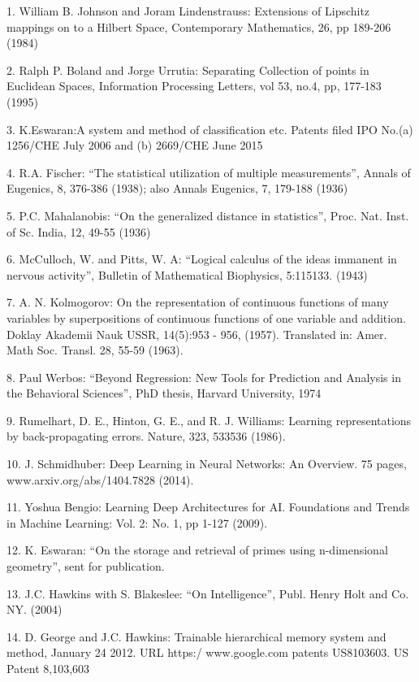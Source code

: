 \documentclass[english]{article}
\begin{document}
1. William B. Johnson and Joram Lindenstrauss: Extensions of Lipschitz
mappings on to a Hilbert Space, Contemporary Mathematics, 26, pp 189-206
(1984)

2. Ralph P. Boland and Jorge Urrutia: Separating Collection of points
in Euclidean Spaces, Information Processing Letters, vol 53, no.4,
pp, 177-183 (1995)

3. K.Eswaran:A system and method of classification etc. Patents filed
IPO No.(a) 1256/CHE July 2006 and (b) 2669/CHE June 2015

4. R.A. Fischer: {}``The statistical utilization of multiple
measurements'', Annals of Eugenics, 8, 376-386 (1938); also Annals
Eugenics, 7, 179-188 (1936)

5. P.C. Mahalanobis: {}``On the generalized distance in statistics'',
Proc. Nat. Inst. of Sc. India, 12, 49-55 (1936)

6. McCulloch, W. and Pitts, W. A: {}``Logical calculus of the
ideas immanent in nervous activity'', Bulletin of Mathematical Biophysics,
5:115\textendash{}133. (1943)

7. A. N. Kolmogorov: On the representation of continuous functions
of many variables by superpositions of continuous functions of one
variable and addition. Doklay Akademii Nauk USSR, 14(5):953 - 956,
(1957). Translated in: Amer. Math Soc. Transl. 28, 55-59 (1963).

8. Paul Werbos: {}``Beyond Regression: New Tools for Prediction
and Analysis in the Behavioral Sciences'', PhD thesis, Harvard University,
1974

9. Rumelhart, D. E., Hinton, G. E., and R. J. Williams: Learning
representations by back-propagating errors. Nature, 323, 533\textendash{}536
(1986).

10. J. Schmidhuber: Deep Learning in Neural Networks: An Overview.
75 pages, www.arxiv.org/abs/1404.7828 (2014).

11. Yoshua Bengio: Learning Deep Architectures for AI. Foundations
and Trends in Machine Learning: Vol. 2: No. 1, pp 1-127 (2009).

12. K. Eswaran: {}``On the storage and retrieval of primes using
n-dimensional geometry'', sent for publication.

13. J.C. Hawkins with S. Blakeslee: {}``On Intelligence'',
Publ. Henry Holt and Co. NY. (2004)

14. D. George and J.C. Hawkins: Trainable hierarchical memory
system and method, January 24 2012. URL https:/ www.google.com patents
US8103603. US Patent 8,103,603
\end{document}
